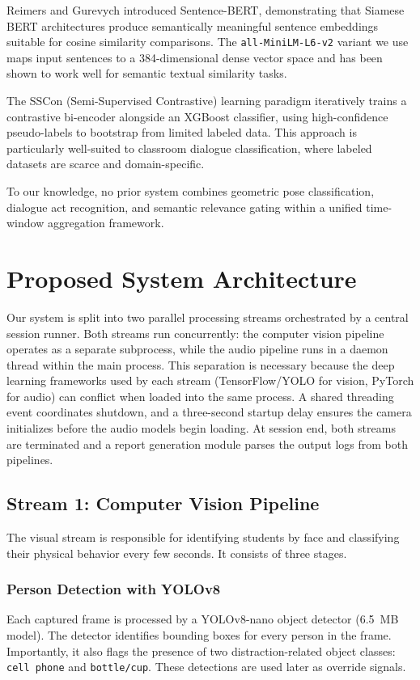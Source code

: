 \documentclass[conference]{IEEEtran}
\begin{document}
Reimers and Gurevych \cite{b3} introduced Sentence-BERT, demonstrating that Siamese BERT architectures produce semantically meaningful sentence embeddings suitable for cosine similarity comparisons. The \texttt{all-MiniLM-L6-v2} variant we use maps input sentences to a 384-dimensional dense vector space and has been shown to work well for semantic textual similarity tasks.

The SSCon (Semi-Supervised Contrastive) learning paradigm \cite{b4} iteratively trains a contrastive bi-encoder alongside an XGBoost classifier, using high-confidence pseudo-labels to bootstrap from limited labeled data. This approach is particularly well-suited to classroom dialogue classification, where labeled datasets are scarce and domain-specific.

To our knowledge, no prior system combines geometric pose classification, dialogue act recognition, and semantic relevance gating within a unified time-window aggregation framework.

\section{Proposed System Architecture}

Our system is split into two parallel processing streams orchestrated by a central session runner. Both streams run concurrently: the computer vision pipeline operates as a separate subprocess, while the audio pipeline runs in a daemon thread within the main process. This separation is necessary because the deep learning frameworks used by each stream (TensorFlow/YOLO for vision, PyTorch for audio) can conflict when loaded into the same process. A shared threading event coordinates shutdown, and a three-second startup delay ensures the camera initializes before the audio models begin loading. At session end, both streams are terminated and a report generation module parses the output logs from both pipelines.

\subsection{Stream 1: Computer Vision Pipeline}

The visual stream is responsible for identifying students by face and classifying their physical behavior every few seconds. It consists of three stages.

\subsubsection{Person Detection with YOLOv8}
Each captured frame is processed by a YOLOv8-nano \cite{b1} object detector (6.5~MB model). The detector identifies bounding boxes for every person in the frame. Importantly, it also flags the presence of two distraction-related object classes: \texttt{cell phone} and \texttt{bottle/cup}. These detections are used later as override signals.
\end{document}
